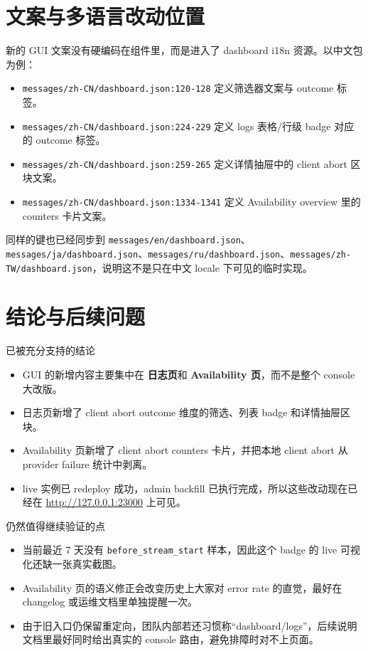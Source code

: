 \documentclass[a4paper]{article}
\newcommand{\filepath}[1]{\nolinkurl{#1}}
\begin{document}
\section{文案与多语言改动位置}

新的 GUI 文案没有硬编码在组件里，而是进入了 dashboard i18n 资源。以中文包为例：

\begin{itemize}
\item \filepath{messages/zh-CN/dashboard.json:120-128} 定义筛选器文案与 outcome 标签。
\item \filepath{messages/zh-CN/dashboard.json:224-229} 定义 logs 表格/行级 badge 对应的 outcome 标签。
\item \filepath{messages/zh-CN/dashboard.json:259-265} 定义详情抽屉中的 client abort 区块文案。
\item \filepath{messages/zh-CN/dashboard.json:1334-1341} 定义 Availability overview 里的 counters 卡片文案。
\end{itemize}

同样的键也已经同步到 \filepath{messages/en/dashboard.json}、\filepath{messages/ja/dashboard.json}、\filepath{messages/ru/dashboard.json}、\filepath{messages/zh-TW/dashboard.json}，说明这不是只在中文 locale 下可见的临时实现。

\section{结论与后续问题}

\begin{findingbox}{已被充分支持的结论}
\begin{itemize}
\item GUI 的新增内容主要集中在 \textbf{日志页}和 \textbf{Availability 页}，而不是整个 console 大改版。
\item 日志页新增了 client abort outcome 维度的筛选、列表 badge 和详情抽屉区块。
\item Availability 页新增了 client abort counters 卡片，并把本地 client abort 从 provider failure 统计中剥离。
\item live 实例已 redeploy 成功，admin backfill 已执行完成，所以这些改动现在已经在 \url{http://127.0.0.1:23000} 上可见。
\end{itemize}
\end{findingbox}

\begin{riskbox}{仍然值得继续验证的点}
\begin{itemize}
\item 当前最近 7 天没有 \texttt{before\_stream\_start} 样本，因此这个 badge 的 live 可视化还缺一张真实截图。
\item Availability 页的语义修正会改变历史上大家对 error rate 的直觉，最好在 changelog 或运维文档里单独提醒一次。
\item 由于旧入口仍保留重定向，团队内部若还习惯称“dashboard/logs”，后续说明文档里最好同时给出真实的 console 路由，避免排障时对不上页面。
\end{itemize}
\end{riskbox}
\end{document}
